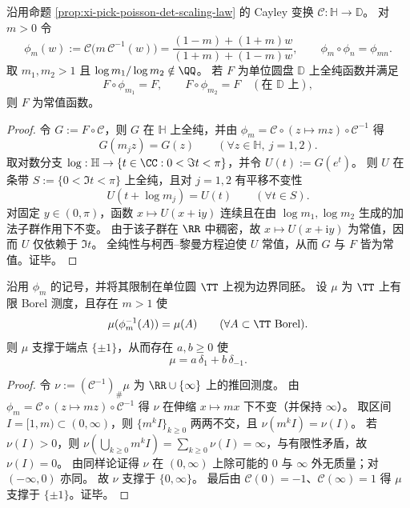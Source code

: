 \begin{theorem}\label{thm:xi-two-scale-cayley-dilation-rigidity}
沿用命题 \ref{prop:xi-pick-poisson-det-scaling-law} 的 Cayley 变换 \(\mathcal{C}:\mathbb{H}\to\mathbb{D}\)。
对 \(m>0\) 令
\[
\phi_m(w):=\mathcal{C}\!\bigl(m\,\mathcal{C}^{-1}(w)\bigr)
=\frac{(1-m)+(1+m)w}{(1+m)+(1-m)w},
\qquad
\phi_m\circ\phi_n=\phi_{mn}.
\]
取 \(m_1,m_2>1\) 且 \(\log m_1/\log m_2\notin\QQ\)。
若 \(F\) 为单位圆盘 \(\mathbb{D}\) 上全纯函数并满足
\[
F\circ\phi_{m_1}=F,
\qquad
F\circ\phi_{m_2}=F
\quad(\text{在 }\mathbb{D}\text{ 上}),
\]
则 \(F\) 为常值函数。
\end{theorem}
\begin{proof}
令 \(G:=F\circ\mathcal{C}\)，则 \(G\) 在 \(\mathbb{H}\) 上全纯，并由 \(\phi_m=\mathcal{C}\circ(z\mapsto mz)\circ\mathcal{C}^{-1}\) 得
\[
G(m_j z)=G(z)\qquad(\forall z\in\mathbb{H},\ j=1,2).
\]
取对数分支 \(\log:\mathbb{H}\to\{t\in\CC:0<\Im t<\pi\}\)，并令 \(U(t):=G(e^t)\)。
则 \(U\) 在条带 \(S:=\{0<\Im t<\pi\}\) 上全纯，且对 \(j=1,2\) 有平移不变性
\[
U(t+\log m_j)=U(t)\qquad(\forall t\in S).
\]
对固定 \(y\in(0,\pi)\)，函数 \(x\mapsto U(x+\mathrm{i}y)\) 连续且在由 \(\log m_1,\log m_2\) 生成的加法子群作用下不变。
由于该子群在 \(\RR\) 中稠密，故 \(x\mapsto U(x+\mathrm{i}y)\) 为常值，因而 \(U\) 仅依赖于 \(\Im t\)。
全纯性与柯西--黎曼方程迫使 \(U\) 常值，从而 \(G\) 与 \(F\) 皆为常值。证毕。
\end{proof}

\begin{proposition}[伸缩不变有限测度的端点原子化]\label{prop:xi-cayley-dilation-invariant-measure-endpoint-atomic}
沿用 \(\phi_m\) 的记号，并将其限制在单位圆 \(\TT\) 上视为边界同胚。
设 \(\mu\) 为 \(\TT\) 上有限 Borel 测度，且存在 \(m>1\) 使
\[
\mu(\phi_m^{-1}(A))=\mu(A)\qquad(\forall A\subset\TT\ \text{Borel}).
\]
则 \(\mu\) 支撑于端点 \(\{\pm 1\}\)，从而存在 \(a,b\ge 0\) 使
\[
\mu=a\,\delta_{1}+b\,\delta_{-1}.
\]
\end{proposition}
\begin{proof}
令 \(\nu:=(\mathcal{C}^{-1})_{\#}\mu\) 为 \(\RR\cup\{\infty\}\) 上的推回测度。
由 \(\phi_m=\mathcal{C}\circ(z\mapsto mz)\circ\mathcal{C}^{-1}\) 得 \(\nu\) 在伸缩 \(x\mapsto mx\) 下不变（并保持 \(\infty\)）。
取区间 \(I=[1,m)\subset(0,\infty)\)，则 \(\{m^k I\}_{k\ge 0}\) 两两不交，且 \(\nu(m^k I)=\nu(I)\)。
若 \(\nu(I)>0\)，则
\(
\nu(\bigcup_{k\ge 0}m^k I)=\sum_{k\ge 0}\nu(I)=\infty
\)，与有限性矛盾，故 \(\nu(I)=0\)。
由同样论证得 \(\nu\) 在 \((0,\infty)\) 上除可能的 \(0\) 与 \(\infty\) 外无质量；对 \((-\infty,0)\) 亦同。
故 \(\nu\) 支撑于 \(\{0,\infty\}\)。
最后由 \(\mathcal{C}(0)=-1\)、\(\mathcal{C}(\infty)=1\) 得 \(\mu\) 支撑于 \(\{\pm 1\}\)。证毕。
\end{proof}

\endinput

